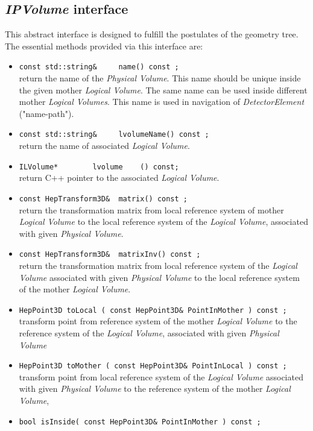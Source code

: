 \subsection{ {\it IPVolume}  interface} 
This abstract interface is designed to fulfill  the postulates of the geometry tree. 
The essential methods provided via this interface are:
\begin{itemize} 
\item 
\verb+const std::string&     name() const ;+
\\ return the name of the {\it Physical Volume}. This name should be unique inside the given 
mother {\it Logical Volume}. The same name can be used inside different mother {\it Logical Volumes}. 
This name is used in navigation of {\it DetectorElement} ("name-path").   
\item 
\verb+const std::string&     lvolumeName() const ;+
\\ return  the name of associated {\it Logical Volume}. 
\item 
\verb+ILVolume*        lvolume    () const;+
\\ return C++ pointer to the associated {\it Logical Volume}. 
\item 
\verb+const HepTransform3D&  matrix() const ;+
\\ return the transformation matrix from local reference system of 
mother {\it Logical Volume} to the local reference system of the 
{\it Logical Volume}, associated with given {\it Physical Volume}.
\item 
\verb+const HepTransform3D&  matrixInv() const ;+
\\ return the transformation matrix from local reference system of 
the {\it Logical Volume} associated with given {\it Physical Volume} 
to the local reference system of the mother {\it Logical Volume}.
\item   
{\tt HepPoint3D toLocal ( const HepPoint3D\& PointInMother ) const ;}
 \\ transform point from reference system of the mother {\it Logical Volume}
to the reference system of the {\it Logical Volume}, associated with given 
{\it Physical Volume}  
\item   
{\tt HepPoint3D toMother ( const HepPoint3D\& PointInLocal ) const ;}
 \\ transform point from local reference system of the {\it Logical Volume}
associated with given {\it Physical Volume}  to the reference system of the mother {\it Logical Volume}, 
\item   
{\tt bool isInside( const HepPoint3D\& PointInMother ) const ;}

\end{itemize}
